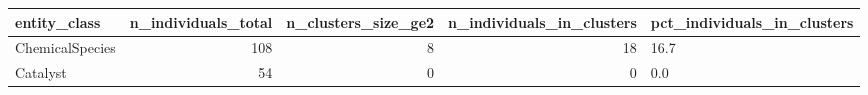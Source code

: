 \begin{tabular}{lrrrl}
\toprule
entity\_class & n\_individuals\_total & n\_clusters\_size\_ge2 & n\_individuals\_in\_clusters & pct\_individuals\_in\_clusters \\
\midrule
ChemicalSpecies & 108 & 8 & 18 & 16.7 \\
Catalyst & 54 & 0 & 0 & 0.0 \\
\bottomrule
\end{tabular}
